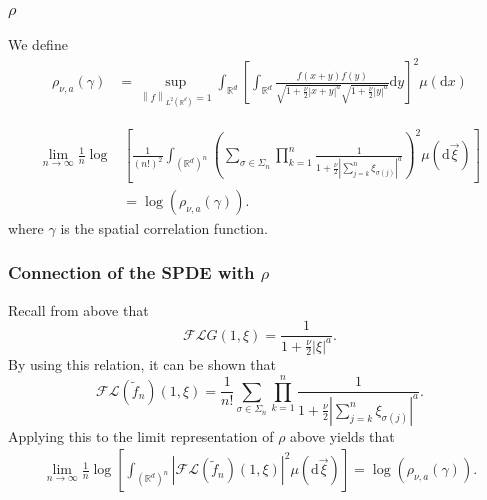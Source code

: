 \documentclass{beamer}%
\numberwithin{equation}{section}
\newcommand{\R}{\mathbb{R}}
\newcommand{\Norm}[1]{\left\|  #1   \right\|}
\newcommand{\ud}{\ensuremath{\mathrm{d} }}
\begin{document}
	\begin{frame}[t]
		\frametitle{$\rho$}
		We define
		\begin{align*}
		\rho_{\nu,a}(\gamma) &= \sup_{\Norm{f}_{L^2(\R^d)} =1} \int_{\R^d} \left[ \int_{\R^d} \frac{f(x+y)f(y)}{\sqrt{1+\frac{\nu}{2}|x+y|^a } \sqrt{1+\frac{\nu}{2}|y|^a} } \ud y \right]^2 \mu(\ud x)
		\end{align*}
		
		
		
		
		\begin{theorem}
			\begin{align*}
			\lim_{n \to \infty} \frac{1}{n} \log & \left[ \frac{1}{(n!)^2} \int_{(\R^d)^n} \left( \sum_{\sigma \in \Sigma_n} \prod_{k=1}^n \frac{1}{1+ \frac{\nu}{2}|\sum_{j=k}^n \xi_{\sigma(j)}|^a}\right)^2 \mu (\ud \vec{\xi})\right]
			\\& = \log\left( \rho_{\nu, a}\left(\gamma\right) \right).
			\end{align*}
			where $\gamma$ is the spatial correlation function.
		\end{theorem}
		
	\end{frame}
	
	\begin{frame}[t]
		\frametitle{Connection of the SPDE with $\rho$}
		Recall from above that
		\[
		\mathcal{F}\mathcal{L}G(1,\xi) = \frac{1}{1+\frac{\nu}{2}|\xi|^a}.
		\]
		By using this relation, it can be shown that
		\[
		\mathcal{F}\mathcal{L}(\tilde{f}_n)(1,\xi) = \frac{1}{n!} \sum_{\sigma \in \Sigma_n} \prod_{k=1}^n \frac{1}{1+ \frac{\nu}{2}|\sum_{j=k}^n \xi_{\sigma(j)}|^a}.
		\]
		Applying this to the limit representation of $\rho$ above yields that
		\begin{align*}
		\lim_{n \to \infty} \frac{1}{n} \log  \left[ \int_{(\R^d)^n} \left| \mathcal{F}\mathcal{L}(\tilde{f}_n)(1,\xi)\right|^2 \mu (\ud \vec{\xi})\right]  = \log\left( \rho_{\nu, a}\left(\gamma\right) \right).
		\end{align*}
	\end{frame}
	
\end{document}

